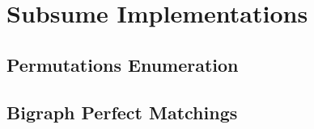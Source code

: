 \documentclass[../main.tex]{subfiles}
\begin{document}
	\section{Subsume Implementations}
	\subsection{Permutations Enumeration}
	\subsection{Bigraph Perfect Matchings}
\end{document}
